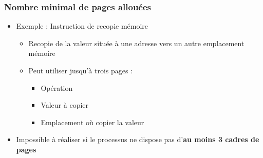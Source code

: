 \begin{frame}
\frametitle{Nombre minimal de pages allouées}
\begin{itemize}
\item Exemple : Instruction de recopie mémoire
\begin{itemize}
\item Recopie de la valeur située à une adresse vers un autre emplacement mémoire
\item Peut utiliser jusqu'à trois pages :
\begin{itemize}
\item Opération
\item Valeur à copier
\item Emplacement où copier la valeur
\end{itemize}
\end{itemize}
\item Impossible à réaliser si le processus ne dispose pas d'\textbf{au moins 3 cadres de pages}
\end{itemize}
\end{frame}


%
%
%


